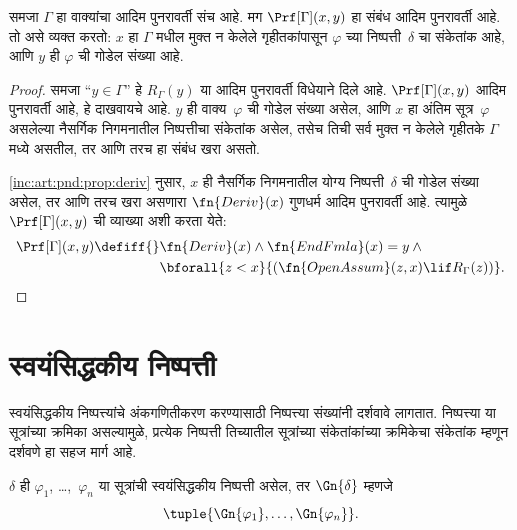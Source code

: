 \begin{prop}
  \label{inc:art:pnd:prop:prf-prim-rec}
  समजा $\Gamma$ हा वाक्यांचा आदिम पुनरावर्ती संच आहे.
  मग $\Prf[\Gamma](x, y)$ हा संबंध आदिम पुनरावर्ती आहे. तो असे व्यक्त
  करतो: $x$ हा $\Gamma$ मधील मुक्त न केलेले गृहीतकांपासून
  $\varphi$ च्या निष्पत्ती~$\delta$ चा संकेतांक आहे, आणि
  $y$ ही $\varphi$ ची गोडेल संख्या आहे.
\end{prop}

\begin{proof}
  समजा ``$y \in \Gamma$'' हे $R_\Gamma(y)$ या आदिम पुनरावर्ती
  विधेयाने दिले आहे. $\Prf[\Gamma](x, y)$ आदिम पुनरावर्ती आहे,
  हे दाखवायचे आहे. $y$ ही वाक्य~$\varphi$ ची गोडेल संख्या असेल,
  आणि $x$ हा अंतिम सूत्र~$\varphi$ असलेल्या नैसर्गिक निगमनातील
  निष्पत्तीचा संकेतांक असेल, तसेच तिची सर्व
  मुक्त न केलेले गृहीतके $\Gamma$ मध्ये असतील, तर आणि तरच हा
  संबंध खरा असतो.

  \ref{inc:art:pnd:prop:deriv} नुसार, $x$ ही नैसर्गिक निगमनातील योग्य
  निष्पत्ती~$\delta$ ची गोडेल संख्या असेल, तर आणि तरच खरा
  असणारा $\fn{Deriv}(x)$ गुणधर्म आदिम पुनरावर्ती आहे. त्यामुळे
  $\Prf[\Gamma](x, y)$ ची व्याख्या अशी करता येते:
  \begin{align*}
    \Prf[\Gamma](x, y) \defiff {}
    & \fn{Deriv}(x) \land \fn{EndFmla}(x) = y \land {} \\
    & \bforall{z < x}{(\fn{OpenAssum}(z, x) \lif R_\Gamma(z))}.
  \end{align*}
\end{proof}











\section{स्वयंसिद्धकीय निष्पत्ती}\label{inc:art:pax:sec}

\begin{explain}
स्वयंसिद्धकीय निष्पत्त्यांचे अंकगणितीकरण करण्यासाठी
निष्पत्त्या संख्यांनी दर्शवावे लागतात. निष्पत्त्या या
सूत्रांच्या क्रमिका असल्यामुळे, प्रत्येक निष्पत्ती
तिच्यातील सूत्रांच्या संकेतांकांच्या क्रमिकेचा संकेतांक
म्हणून दर्शवणे हा सहज मार्ग आहे.
\end{explain}

\begin{defn}
$\delta$ ही $\varphi_1$, \dots,~$\varphi_n$ या सूत्रांची
स्वयंसिद्धकीय निष्पत्ती असेल, तर $\Gn{\delta}$ म्हणजे
\[\tuple{\Gn{\varphi_1}, \dots, \Gn{\varphi_n}}.
\]
\end{defn}

